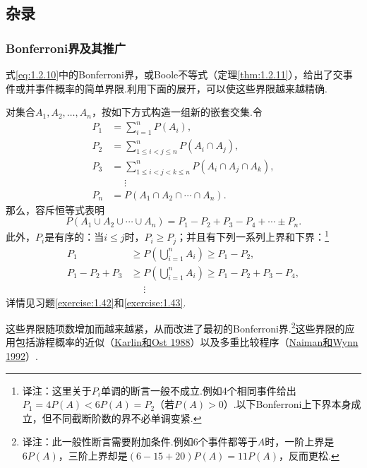 \subsection{杂录}\label{sec:1.8}
\subsubsection{Bonferroni界及其推广}\label{sec:1.8.1}
式\eqref{eq:1.2.10}中的Bonferroni界，或Boole不等式（定理\ref{thm:1.2.11}），给出了交事件或并事件概率的简单界限.利用下面的展开，可以使这些界限越来越精确.

对集合$A_1,A_2,\ldots,A_n$，按如下方式构造一组新的嵌套交集.令
$$
\begin{aligned}
P_1&=\sum_{i=1}^n P(A_i),\\
P_2&=\sum_{1\le i<j\le n}^{n}P(A_i\cap A_j),\\
P_3&=\sum_{1\le i<j<k\le n}^{n}P(A_i\cap A_j\cap A_k),\\
&\mathrel{\phantom{=}}\vdots\\
P_n&=P(A_1\cap A_2\cap\cdots\cap A_n).
\end{aligned}
$$
那么，容斥恒等式表明
$$
P(A_1\cup A_2\cup\cdots\cup A_n)=P_1-P_2+P_3-P_4+\cdots\pm P_n.
$$
此外，$P_i$是有序的：当$i\le j$时，$P_i\ge P_j$；并且有下列一系列上界和下界：\footnote{译注：这里关于$P_i$单调的断言一般不成立.例如4个相同事件给出$P_1=4P(A)<6P(A)=P_2$（若$P(A)>0$）.以下Bonferroni上下界本身成立，但不同截断阶数的界不必单调变紧.}
$$
\begin{aligned}
P_1&\ge P\left(\bigcup_{i=1}^{n}A_i\right)\ge P_1-P_2,\\
P_1-P_2+P_3&\ge P\left(\bigcup_{i=1}^{n}A_i\right)\ge P_1-P_2+P_3-P_4,\\
&\mathrel{\phantom{\ge}}\vdots
\end{aligned}
$$
详情见习题\ref{exercise:1.42}和\ref{exercise:1.43}.

这些界限随项数增加而越来越紧，从而改进了最初的Bonferroni界.\footnote{译注：此一般性断言需要附加条件.例如6个事件都等于$A$时，一阶上界是$6P(A)$，三阶上界却是$(6-15+20)P(A)=11P(A)$，反而更松.}这些界限的应用包括游程概率的近似（\hyperref[bib:source187]{Karlin和Ost 1988}）以及多重比较程序（\hyperref[bib:source230]{Naiman和Wynn 1992}）.


